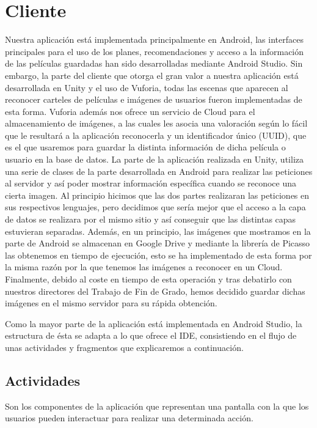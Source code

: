 \section{Cliente}
\label{makereference4.3}
Nuestra aplicación está implementada principalmente en Android, las interfaces principales para el uso de los planes, recomendaciones y acceso a la información de las películas guardadas han sido desarrolladas mediante Android Studio. Sin embargo,
la parte del cliente que otorga el gran valor a nuestra aplicación está desarrollada en Unity y el uso de Vuforia, todas las escenas que aparecen al reconocer carteles de películas e imágenes de usuarios fueron implementadas de esta forma. Vuforia además nos ofrece un
servicio de Cloud para el almacenamiento de imágenes, a las cuales les asocia una valoración según lo fácil que le resultará a la aplicación reconocerla y un identificador único (UUID), que es el que usaremos para guardar la distinta información de dicha película o usuario en la base de datos.
La parte de la aplicación realizada en Unity, utiliza una serie de clases de la parte desarrollada en Android para realizar las peticiones al servidor y así poder mostrar información específica cuando se reconoce una cierta imagen.
Al principio hicimos que las dos partes realizaran las peticiones en sus respectivos lenguajes, pero decidimos que sería mejor que el acceso a la capa de datos se realizara por el mismo sitio y así conseguir que las distintas capas estuvieran separadas.
Además, en un principio, las imágenes que mostramos en la parte de Android se almacenan en Google Drive y mediante la librería de Picasso las obtenemos en tiempo de ejecución, esto se ha implementado de esta forma por la misma razón por la que tenemos las imágenes a reconocer en un Cloud.
Finalmente, debido al coste en tiempo de esta operación y tras debatirlo con nuestros directores del Trabajo de Fin de Grado, hemos decidido guardar dichas imágenes en el mismo servidor para su rápida obtención.


Como la mayor parte de la aplicación está implementada en Android Studio, la estructura de ésta se adapta a lo que ofrece el IDE, consistiendo en el flujo de unas actividades y fragmentos que explicaremos a continuación.


\subsection{Actividades}
\label{makereference4.3.1}
Son los componentes de la aplicación que representan una pantalla con la que los usuarios pueden interactuar para realizar una determinada acción.

